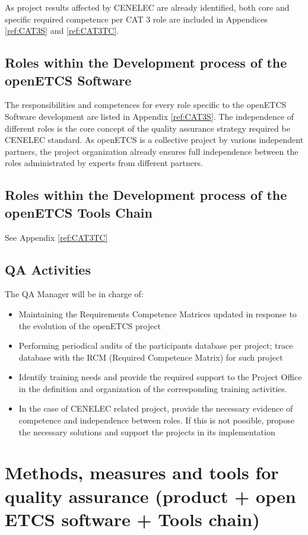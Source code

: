 \documentclass{template/openetcs_article}
\begin{document}
As project results affected by CENELEC are already identified, both core and specific required competence per CAT 3 role are included in Appendices \ref{ref:CAT3S} and \ref{ref:CAT3TC}.

\subsection{Roles within the Development process of the openETCS Software}
The responsibilities and competences for every role specific to the openETCS Software development are listed in Appendix \ref{ref:CAT3S}. The independence of different roles is the core concept of the quality assurance strategy required be CENELEC standard. As openETCS is a collective project by various independent partners, the project organization already ensures full independence between the roles administrated by experts from different partners. 

\subsection{Roles within the Development process of the openETCS Tools Chain}

See Appendix \ref{ref:CAT3TC}
\subsection{QA Activities}

The QA Manager will be in charge of:
\begin{itemize}
\item Maintaining the Requirements Competence Matrices updated in response to the evolution of the openETCS project
\item Performing periodical audits of the participants{\textquotesingle} database per project; trace database with the RCM (Required Competence Matrix) for such project
\item Identify training needs and provide the required support to the Project Office in the definition and organization of the corresponding training activities.
\item In the case of CENELEC related project, provide the necessary evidence of competence and independence between roles. If this is not possible, propose the necessary solutions and support the projects in its implementation
\end{itemize}

\section{Methods, measures and tools for quality assurance (product + open \gls{ETCS} software + Tools chain)}
\end{document}
